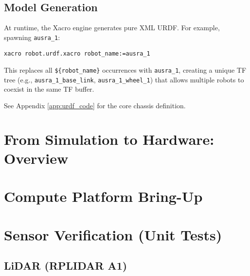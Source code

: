 \subsection{Model Generation}

At runtime, the Xacro engine generates pure XML URDF. For example, spawning \texttt{ausra\_1}:
\begin{verbatim}
xacro robot.urdf.xacro robot_name:=ausra_1
\end{verbatim}

This replaces all \texttt{\$\{robot\_name\}} occurrences with \texttt{ausra\_1}, creating a unique TF tree (e.g., \texttt{ausra\_1\_base\_link}, \texttt{ausra\_1\_wheel\_1}) that allows multiple robots to coexist in the same TF buffer.

See Appendix \ref{app:urdf_code} for the core chassis definition.


\section{From Simulation to Hardware: Overview}
\label{sec:sim_to_hw_overview}

\section{Compute Platform Bring-Up}
\label{sec:compute_bringup}

\section{Sensor Verification (Unit Tests)}
\label{sec:sensor_verification}

\subsection{LiDAR (RPLIDAR A1)}
\label{subsec:hw_lidar_test}

